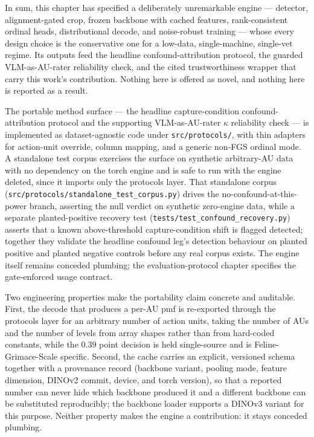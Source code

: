 In sum, this chapter has specified a deliberately unremarkable engine ---
detector, alignment-gated crop, frozen backbone with cached features,
rank-consistent ordinal heads, distributional decode, and noise-robust training
--- whose every design choice is the conservative one for a low-data,
single-machine, single-vet regime. Its outputs feed the headline confound-attribution
protocol, the guarded VLM-as-AU-rater reliability check, and the cited
trustworthiness wrapper that carry this work's contribution. Nothing here
is offered as novel, and nothing here is reported as a result.

The portable method surface --- the headline capture-condition
confound-attribution protocol and the supporting VLM-as-AU-rater $\kappa$
reliability check --- is implemented as dataset-agnostic code under
\texttt{src/protocols/}, with thin adapters for action-unit override, column
mapping, and a generic non-FGS ordinal mode. A standalone test corpus exercises
the surface on synthetic arbitrary-AU data with no dependency on the torch engine
and is safe to run with the engine deleted, since it imports only the protocols
layer. That standalone corpus
(\texttt{src/protocols/standalone\_test\_corpus.py}) drives the
no-confound-at-this-power branch, asserting the null verdict on synthetic
zero-engine data, while a separate planted-positive recovery test
(\texttt{tests/test\_confound\_recovery.py}) asserts that a known
above-threshold capture-condition shift is flagged detected; together they
validate the headline confound leg's detection behaviour on planted positive
and planted negative controls before any real corpus exists. The engine itself remains conceded plumbing; the
evaluation-protocol chapter specifies the gate-enforced usage contract.

Two engineering properties make the portability claim concrete and auditable.
First, the decode that produces a per-AU pmf is re-exported through the protocols
layer for an arbitrary number of action units, taking the number of AUs and the
number of levels from array shapes rather than from hard-coded constants, while
the $0.39$ point decision is held single-source and is Feline-Grimace-Scale
specific. Second, the cache carries an explicit, versioned schema together with a
provenance record (backbone variant, pooling mode, feature dimension, DINOv2
commit, device, and torch version), so that a reported number can never hide which
backbone produced it and a different backbone can be substituted reproducibly; the
backbone loader supports a DINOv3 variant for this purpose. Neither property makes
the engine a contribution: it stays conceded plumbing.

